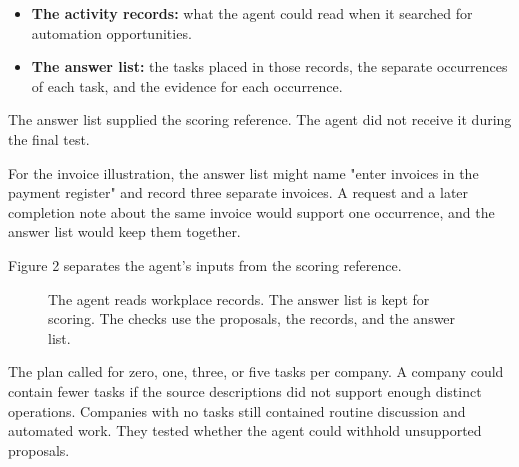 \documentclass[11pt]{article}
\begin{document}
\begin{itemize}
\item \textbf{The activity records:} what the agent could read when it searched for automation opportunities.
\item \textbf{The answer list:} the tasks placed in those records, the separate occurrences of each task, and the evidence for each occurrence.
\end{itemize}

The answer list supplied the scoring reference. The agent did not receive it during the final test.

For the invoice illustration, the answer list might name "enter invoices in the payment register" and record three separate invoices. A request and a later completion note about the same invoice would support one occurrence, and the answer list would keep them together.

Figure 2 separates the agent's inputs from the scoring reference.

\begin{figure}[htbp]
\centering
{}
\caption{The agent reads workplace records. The answer list is kept for scoring. The checks use the proposals, the records, and the answer list.}
\end{figure}
The plan called for zero, one, three, or five tasks per company. A company could contain fewer tasks if the source descriptions did not support enough distinct operations. Companies with no tasks still contained routine discussion and automated work. They tested whether the agent could withhold unsupported proposals.
\end{document}
